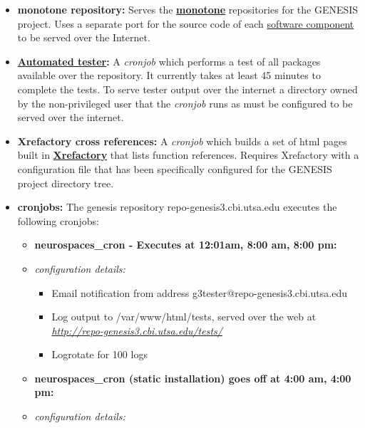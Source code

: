 \documentclass[12pt]{article}
\begin{document}
\begin{itemize}

\item {\bf monotone repository:} Serves the \href{http://www.monotone.ca/}{\bf monotone} repositories for the GENESIS project. Uses a separate port for the source code of each \href{../genesis-components/genesis-components.tex}{software component} to be served over the Internet.

\item {\bf \href{../neurospaces-tester/neurospaces-tester.tex}{Automated tester}:} A {\it cronjob} which performs a test of all packages available over the repository.  It currently takes at least 45 minutes to complete the tests. To serve tester output over the internet a directory owned by the non-privileged user that the {\it cronjob} runs as must be configured to be served over the internet.

\item {\bf Xrefactory cross references:} A {\it cronjob} which builds a set of html pages built in \href{http://www.xref-tech.com/xrefactory/main.html}{\bf Xrefactory} that lists function references.  Requires Xrefactory with a configuration file that has been specifically configured for the GENESIS project directory tree. 

\item {\bf cronjobs:} The genesis repository repo-genesis3.cbi.utsa.edu executes the following cronjobs:

\begin{itemize}
\item[] {\bf neurospaces\_cron - Executes at 12:01am, 8:00 am, 8:00 pm:}
	\item {\it configuration details:} 
\begin{itemize}

	\item Email notification from address g3tester@repo-genesis3.cbi.utsa.edu
	\item Log output to /var/www/html/tests, served over the web at \href{http://repo-genesis3.cbi.utsa.edu/tests/}{\it http://repo-genesis3.cbi.utsa.edu/tests/}
	\item Logrotate for 100 logs
\end{itemize}
		
\item[] {\bf neurospaces\_cron (static installation) \- goes off at 4:00 am, 4:00 pm:}
	\item {\it configuration details:} 
\begin{itemize}


\end{itemize}
\end{itemize}
\end{itemize}
\end{document}
